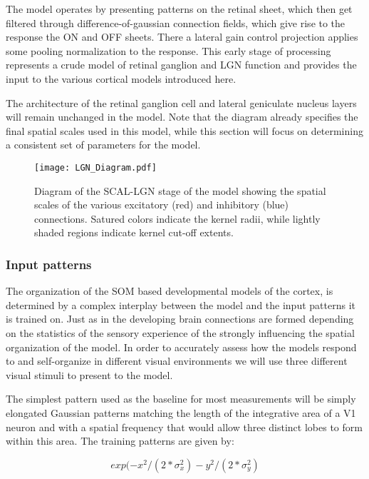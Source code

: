The model operates by presenting patterns on the retinal sheet, which
then get filtered through difference-of-gaussian connection fields,
which give rise to the response the ON and OFF sheets. There a lateral
gain control projection applies some pooling normalization to the
response. This early stage of processing represents a crude model of
retinal ganglion and LGN function and provides the input to the
various cortical models introduced here.

The architecture of the retinal ganglion cell and lateral geniculate
nucleus layers will remain unchanged in the model. Note that the
diagram already specifies the final spatial scales used in this model,
while this section will focus on determining a consistent set of
parameters for the model.

\begin{figure}
	\centering
        \texttt{[image: LGN\_Diagram.pdf]}
	\caption{Diagram of the SCAL-LGN stage of the model showing
          the spatial scales of the various excitatory (red) and
          inhibitory (blue) connections. Satured colors indicate the
          kernel radii, while lightly shaded regions indicate kernel
          cut-off extents.}
	\label{LGNDiagram}
\end{figure}

\subsubsection{Input patterns}

The organization of the SOM based developmental models of the cortex,
is determined by a complex interplay between the model and the input
patterns it is trained on. Just as in the developing brain connections
are formed depending on the statistics of the sensory experience of
the strongly influencing the spatial organization of the model. In
order to accurately assess how the models respond to and self-organize
in different visual environments we will use three different visual
stimuli to present to the model.

The simplest pattern used as the baseline for most measurements will
be simply elongated Gaussian patterns matching the length of the
integrative area of a V1 neuron and with a spatial frequency that
would allow three distinct lobes to form within this area. The
training patterns are given by:

\begin{equation}
  exp(-x^2/(2*\sigma_x^2) - y^2/(2*\sigma_y^2)
\label{eqn:gausspattern}
\end{equation}

